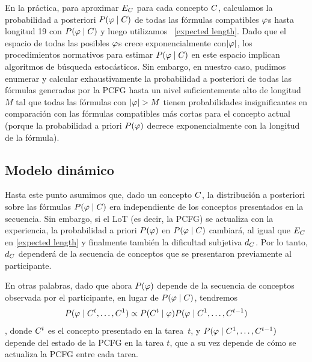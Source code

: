 En la práctica, para aproximar $E_C$ para cada concepto $C$, calculamos la probabilidad a posteriori $P(\varphi\mid C)$ de todas las fórmulas compatibles $\varphi$s hasta longitud 19 con $P(\varphi\mid C)$ y luego utilizamos ~\eqref{expected length}. Dado que el espacio de todas las posibles $\varphi$s crece exponencialmente con$|\varphi|$, los procedimientos normativos para estimar $P(\varphi\mid C)$ en este espacio implican algoritmos de búsqueda estocásticos. Sin embargo, en nuestro caso, pudimos enumerar y calcular exhaustivamente la probabilidad a posteriori de todas las fórmulas generadas por la PCFG hasta un nivel suficientemente alto de longitud $M$ tal que todas las fórmulas con $|\form|>M$ tienen probabilidades insignificantes en comparación con las fórmulas compatibles más cortas para el concepto actual (porque la probabilidad a priori $P(\varphi)$ decrece exponencialmente con la longitud de la fórmula).

\subsection{Modelo dinámico}


Hasta este punto asumimos que, dado un concepto $C$, la distribución a posteriori sobre las fórmulas $P(\varphi\mid C)$ era independiente de los conceptos presentados en la secuencia. Sin embargo, si el LoT (es decir, la PCFG) se actualiza con la experiencia, la probabilidad a priori $P(\varphi)$ en $P(\varphi\mid C)$ cambiará, al igual que $E_C$ en \eqref{expected length} y finalmente también la dificultad subjetiva $d_C$. Por lo tanto, $d_C$ dependerá de la secuencia de conceptos que se presentaron previamente al participante.

En otras palabras, dado que ahora $P(\varphi)$ depende de la secuencia de conceptos observada por el participante, en lugar de $P(\varphi\mid C)$, tendremos $$P(\varphi\mid C^{t},\dots,C^{1}) \propto P(C^{t}\mid \varphi)P(\varphi\mid C^{1},\dots,C^{t-1})$$, 
%
donde $C^{t}$ es el concepto presentado en la tarea~$t$, y $P(\varphi\mid C^{1},\dots,C^{t-1})$ depende del estado de la PCFG en la tarea $t$, que a su vez depende de cómo se actualiza la PCFG entre cada tarea.

